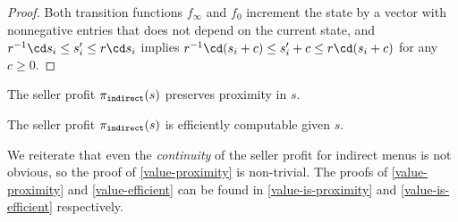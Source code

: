 \begin{proof}
    Both transition functions $f_\infty$ and $f_0$ increment the state by a vector with nonnegative entries that does not depend on the current state, and $r^{-1} \cd s_i \le s'_i \le r\cd s_i$ implies $r^{-1} \cd (s_i + c) \le s'_i + c \le r\cd (s_i + c)$ for any $c \ge 0$.
\end{proof}

\begin{lemma} \label{value-proximity}
    The seller profit $\pi_{\tt{indirect}}(s)$ preserves proximity in $s$.
\end{lemma}

\begin{lemma}[Computability] \label{value-efficient}
    The seller profit $\pi_{\tt{indirect}}(s)$ is efficiently computable given $s$.
\end{lemma}

We reiterate that even the \emph{continuity} of the seller profit for indirect menus is not obvious, so the proof of \cref{value-proximity} is non-trivial. The proofs of \cref{value-proximity} and 
\cref{value-efficient} can be found in \cref{value-is-proximity} and \cref{value-is-efficient} respectively.

    
    
